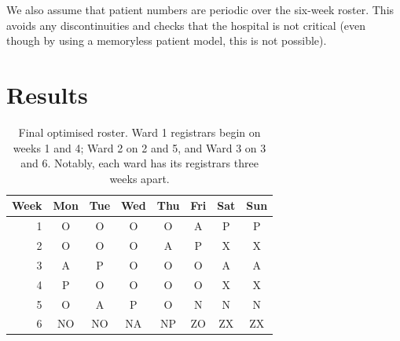 \documentclass[a4paper]{article}
\begin{document}
We also assume that patient numbers are periodic over the six-week roster. This avoids any discontinuities and checks that the hospital is not critical (even though by using a memoryless patient model, this is not possible).

\section{Results}
\begin{table}[H]
\centering
\caption{Final optimised roster. Ward 1 registrars begin on weeks 1 and 4; Ward 2 on 2 and 5, and Ward 3 on 3 and 6. Notably, each ward has its registrars three weeks apart.}
\label{tab:roster}
\begin{tabular}{r|ccccccc}
Week & Mon & Tue & Wed & Thu & Fri & Sat & Sun \\
\hline
 1	& O	& O	& O	& O	& A	& P	& P	\\
 2	& O	& O	& O	& A	& P	& X	& X	\\
 3	& A	& P	& O	& O	& O	& A	& A	\\
 4	& P	& O	& O	& O	& O	& X	& X	\\
 5	& O	& A	& P	& O	& N	& N	& N	\\
 6	& NO	& NO	& NA	& NP	& ZO	& ZX	& ZX	\\
\end{tabular}
\end{table}
\end{document}
